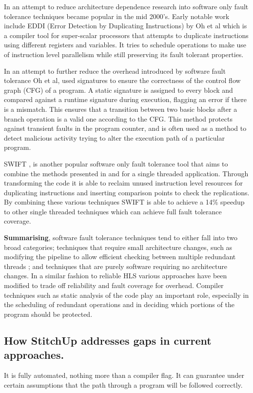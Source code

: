 In an attempt to reduce architecture dependence research into software only fault tolerance techniques became popular in the mid 2000's.
Early notable work include EDDI (Error Detection by Duplicating Instructions) by Oh et al \cite{oh2002error} which is a compiler
tool for super-scalar processors that attempts to duplicate instructions using different registers and variables.
It tries to schedule operations to make use of instruction level parallelism while still preserving its fault tolerant properties.

In an attempt to further reduce the overhead introduced by software fault tolerance Oh et al, \cite{oh2002control} used signatures
to ensure the correctness of the control flow graph (CFG) of a program.
A static signature is assigned to every block and compared against a runtime signature during execution, flagging an error
if there is a mismatch.
This ensures that a transition between two basic blocks after a branch operation is a valid one according to the CFG.
This method protects against transient faults in the program counter, and is often used as a method to detect malicious activity
trying to alter the execution path of a particular program.

SWIFT \cite{reis2005swift}, is another popular software only fault tolerance tool that aims to combine the methods
presented in \cite{oh2002error} and \cite{oh2002control} for a single threaded application.
Through transforming the code it is able to reclaim unused instruction level resources
for duplicating instructions and inserting comparison points to check the replications.
By combining these various techniques SWIFT is able to achieve a 14\% speedup to other single threaded techniques
which can achieve full fault tolerance coverage.

\textbf{Summarising}, software fault tolerance techniques tend to either fall into two broad categories; techniques that
require small architecture changes, such as modifying the pipeline to allow efficient checking between multiple redundant
threads \cite{vijaykumar2002transient}; and techniques that are purely software requiring no architecture changes.
In a similar fashion to reliable HLS various approaches have been modified to trade off reliability and fault coverage
for overhead.
Compiler techniques such as static analysis of the code play an important role, especially in the scheduling of redundant
operations and in deciding which portions of the program should be protected.

\subsection{How StitchUp addresses gaps in current approaches.}
It is fully automated, nothing more than a compiler flag. It can guarantee under certain assumptions that the
path through a program will be followed correctly.
